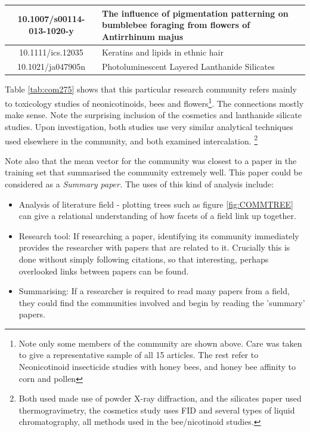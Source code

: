 \begin{table}[H]
\begin{tabular}{||c|X||}
10.1007/s00114-013-1020-y        & \footnotesize{The influence of pigmentation patterning on bumblebee foraging from flowers of Antirrhinum majus                                                                  } \\ \hline
10.1111/ics.12035                & \footnotesize{ Keratins and lipids in ethnic hair                                                                                                                                } \\ \hline
10.1021/ja047905n                & \footnotesize{Photoluminescent Layered Lanthanide Silicates                                                                                                                     } \\ \hline
\end{tabular}
\end{table}

Table \ref{tab:com275} shows that this particular research community refers mainly to toxicology studies of neonicotinoids,  bees and flowers\footnote{Note only some members of the community are shown above. Care was taken to give a representative sample of all 15 articles. The rest refer to Neonicotinoid insecticide studies with honey bees, and honey bee affinity to corn and pollen}. The connections mostly make sense. Note the surprising inclusion of the cosmetics and lanthanide silicate studies. Upon investigation, both studies use very similar analytical techniques used elsewhere in the community, and both examined intercalation.
\footnote{Both used made use of powder X-ray diffraction, and the silicates paper used thermogravimetry, the cosmetics study uses FID and several types of liquid chromatography, all methods used in the bee/nicotinoid studies.}

Note also that the mean vector for the community was closest to a paper in the training set that summarised the community extremely well. This paper could be considered as a \emph{Summary paper.}
The uses of this kind of analysis include:
\begin{itemize}
\item Analysis of literature field - plotting trees such as figure \ref{fig:COMMTREE} can give a relational understanding of how facets of a field link up together. 
\item Research tool: If researching a paper, identifying its community immediately provides the researcher with papers that are related to it. Crucially this is done without simply following citations, so that interesting, perhaps overlooked links between papers can be found.
\item Summarising: If a researcher is required to read many papers from a field, they could find the communities involved and begin by reading the 'summary' papers. 
\end{itemize}

